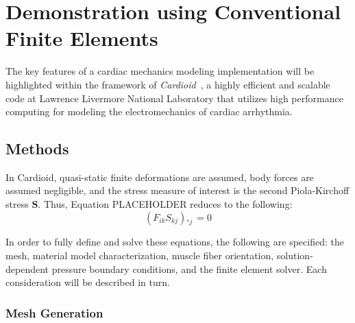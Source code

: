 \section{Demonstration using Conventional Finite Elements}

The key features of a cardiac mechanics modeling implementation will be highlighted within the framework of \textit{Cardioid}~\cite{richards_2013, gurev_2015}, a highly efficient and scalable code at Lawrence Livermore National Laboratory that utilizes high performance computing for modeling the electromechanics of cardiac arrhythmia.

\subsection{Methods}
\label{Methods}

In Cardioid, quasi-static finite deformations are assumed, body forces are assumed negligible, and the stress measure of interest is the second Piola-Kirchoff stress $\bm{S}$. Thus, Equation PLACEHOLDER reduces to the following:
\begin{equation}
(F_{ik}S_{kj}),_{j} = 0
\end{equation}

In order to fully define and solve these equations, the following are specified: the mesh, material model characterization, muscle fiber orientation, solution-dependent pressure boundary conditions, and the finite element solver. Each consideration will be described in turn.

\subsubsection{Mesh Generation}
\label{Mesh Generation}

